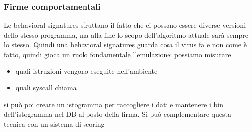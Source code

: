 \documentclass[12pt, oneside]{extbook} %
\begin{document}
\subsubsection{Firme comportamentali}
Le behavioral signatures sfruttano il fatto che ci possono essere diverse versioni dello stesso programma, ma alla fine lo scopo dell'algoritmo attuale sarà sempre lo stesso. Quindi una behavioral signatures guarda cosa il virus fa e non come è fatto, quindi gioca un ruolo fondamentale l'emulazione: possiamo misurare 
\begin{itemize}
\item quali istruzioni vengono eseguite nell'ambiente
\item quali syscall chiama
\end{itemize}
si può poi creare un istogramma per raccogliere i dati e mantenere i bin dell'istogramma nel DB al posto della firma. Si può complementare questa tecnica con un sistema di scoring
\end{document}
